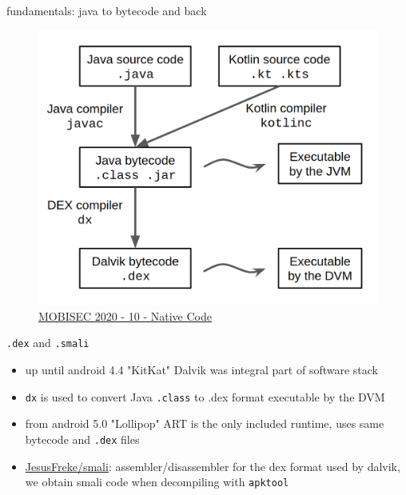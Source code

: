 \documentclass{beamer}
\begin{document}
\begin{frame}{fundamentals: java to bytecode and back}

    \begin{figure}
        \centering \includegraphics[scale=0.2]{java-to-dex.png}
        \caption{\href{https://docs.google.com/presentation/d/14nid9QJrSRUd4T_48KZMhWqKT_UdLg7EM-RH0HFQYdM}{MOBISEC 2020 - 10 - Native Code}}
    \end{figure}

\end{frame}

\begin{frame}{\texttt{.dex} and \texttt{.smali}}

    \begin{itemize}
        \item up until android 4.4 "KitKat" Dalvik was integral part of software stack
        \item \texttt{dx} is used to convert Java \texttt{.class} to {.dex} format executable by the DVM
        \item from android 5.0 "Lollipop" ART is the only included runtime, uses same bytecode and \texttt{.dex} files
        \item \href{https://github.com/JesusFreke/smali}{JesusFreke/smali}: assembler/disassembler for the dex format used by dalvik, we obtain smali code when decompiling with \texttt{apktool}
    \end{itemize}

\end{frame}
\end{document}
